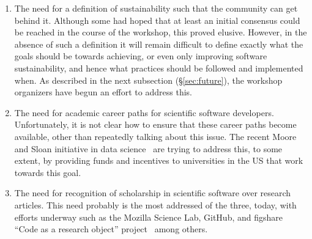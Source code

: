 \documentclass[11pt, oneside]{amsart}
\begin{document}
\begin{enumerate}
\item The need for a definition of sustainability such that the
  community can get behind it. Although some had hoped that at least
  an initial consensus could be reached in the course of the workshop,
  this proved elusive. However, in the absence of such a definition it
  will remain difficult to define exactly what the goals should be
  towards achieving, or even only improving software sustainability,
  and hence what practices should be followed and implemented when. As
  described in the next subsection (\S\ref{sec:future}), the workshop
  organizers have begun an effort to address this.

\item The need for academic career paths for scientific software
  developers.  Unfortunately, it is not clear how to ensure that these
  career paths become available, other than repeatedly talking about
  this issue. The recent Moore and Sloan initiative in data
  science~\cite{moore_sloan} are trying to address this, to some
  extent, by providing funds and incentives to universities in the US
  that work towards this goal.

%
%
%

\item The need for recognition of scholarship in scientific software
  over research articles. This need probably is the most addressed of
  the three, today, with efforts underway such as the Mozilla Science
  Lab, GitHub, and figshare ``Code as a research object''
  project~\cite{code_as_a_research_object} among others.

\end{enumerate}

\end{document}
